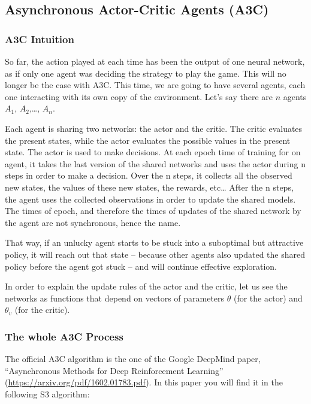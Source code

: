 \documentclass[]{book}
\begin{document}
\newpage

\subsection{Asynchronous Actor-Critic Agents (A3C)}

\subsubsection{A3C Intuition}

So far, the action played at each time has been the output of one neural network, as if only one agent was deciding the strategy to play the game. This will no longer be the case with A3C. This time, we are going to have several agents, each one interacting with its own copy of the environment. Let's say there are \(n\) agents \(A_1\), \(A_2\),\ldots{}, \(A_n\).

Each agent is sharing two networks: the actor and the critic. The critic evaluates the present states, while the actor evaluates the possible values in the present state. The actor is used to make decisions. At each epoch time of training for on agent, it takes the last version of the shared networks and uses the actor during n steps in order to make a decision. Over the n steps, it collects all the observed new states, the values of these new states, the rewards, etc\ldots{} After the n steps, the agent uses the collected observations in order to update the shared models. The times of epoch, and therefore the times of updates of the shared network by the agent are not synchronous, hence the name.

That way, if an unlucky agent starts to be stuck into a suboptimal but attractive policy, it will reach out that state -- because other agents also updated the shared policy before the agent got stuck -- and will continue effective exploration.

In order to explain the update rules of the actor and the critic, let us see the networks as functions that depend on vectors of parameters \(\theta\) (for the actor) and \(\theta_v\) (for the critic).

\subsubsection{The whole A3C Process}

The official A3C algorithm is the one of the Google DeepMind paper, ``Asynchronous Methods for Deep Reinforcement Learning'' (\url{https://arxiv.org/pdf/1602.01783.pdf}). In this paper you will find it in the following S3 algorithm:
\end{document}
